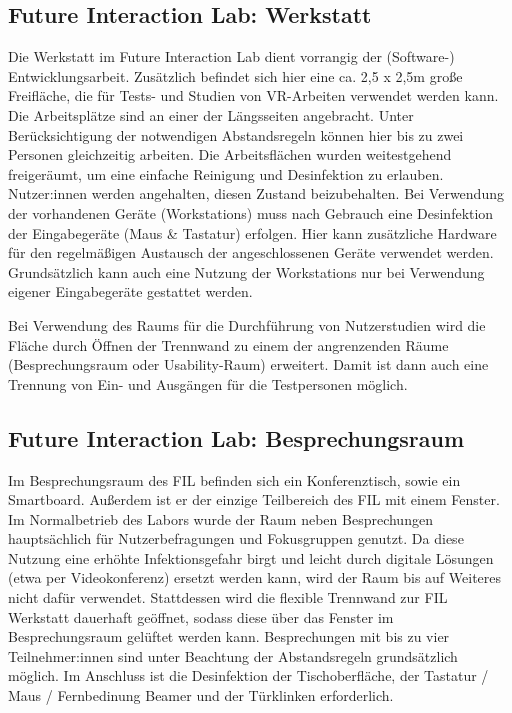 \subsection{Future Interaction Lab: Werkstatt}\label{subsec:labore_fil_werkstatt}


\noindent
Die Werkstatt im Future Interaction Lab dient vorrangig der (Software-) Entwicklungsarbeit.
Zusätzlich befindet sich hier eine ca.
2,5 x 2,5m große Freifläche, die für Tests- und Studien von VR-Arbeiten verwendet werden kann.
Die Arbeitsplätze sind an einer der Längsseiten angebracht. Unter Berücksichtigung der notwendigen Abstandsregeln können hier bis zu zwei Personen gleichzeitig arbeiten.
Die Arbeitsflächen wurden weitestgehend freigeräumt, um eine einfache Reinigung und Desinfektion zu erlauben.
Nutzer:innen werden angehalten, diesen Zustand beizubehalten.
Bei Verwendung der vorhandenen Geräte (Workstations) muss nach Gebrauch eine Desinfektion der Eingabegeräte (Maus \& Tastatur) erfolgen.
Hier kann zusätzliche Hardware für den regelmäßigen Austausch der angeschlossenen Geräte verwendet werden.
Grundsätzlich kann auch eine Nutzung der Workstations nur bei Verwendung eigener Eingabegeräte gestattet werden.

\medskip
\noindent
Bei Verwendung des Raums für die Durchführung von Nutzerstudien wird die Fläche durch Öffnen der Trennwand zu einem der angrenzenden Räume (Besprechungsraum oder Usability-Raum) erweitert.
Damit ist dann auch eine Trennung von Ein- und Ausgängen für die Testpersonen möglich.

\subsection{Future Interaction Lab: Besprechungsraum}\label{subsec:labore_fil_besprechungsraum}


\noindent
Im Besprechungsraum des FIL befinden sich ein Konferenztisch, sowie ein Smartboard.
Außerdem ist er der einzige Teilbereich des FIL mit einem Fenster.
Im Normalbetrieb des Labors wurde der Raum neben Besprechungen hauptsächlich für Nutzerbefragungen und Fokusgruppen genutzt.
Da diese Nutzung eine erhöhte Infektionsgefahr birgt und leicht durch digitale Lösungen (etwa per Videokonferenz) ersetzt werden kann, wird der Raum bis auf Weiteres nicht dafür verwendet.
Stattdessen wird die flexible Trennwand zur FIL Werkstatt dauerhaft geöffnet, sodass diese über das Fenster im Besprechungsraum gelüftet werden kann.
Besprechungen mit bis zu vier Teilnehmer:innen sind unter Beachtung der Abstandsregeln grundsätzlich möglich.
Im Anschluss ist die Desinfektion der Tischoberfläche, der Tastatur / Maus / Fernbedinung Beamer und der Türklinken erforderlich.

